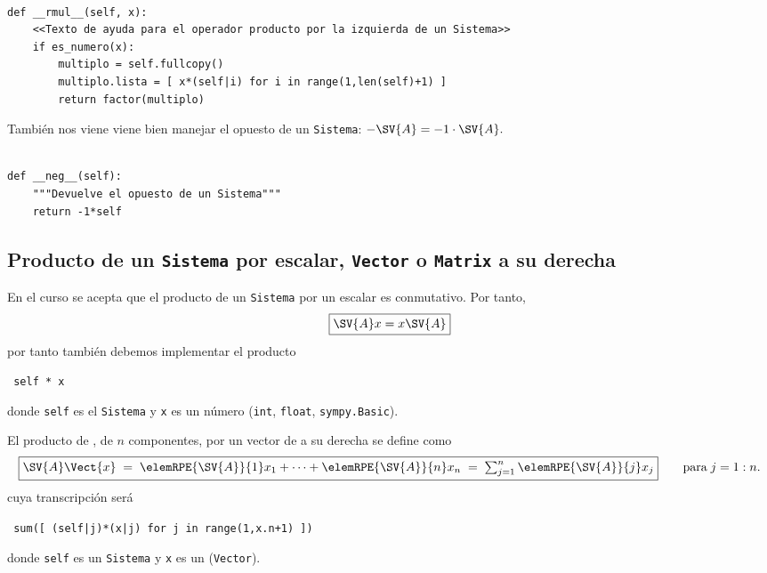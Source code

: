 \documentclass[11pt]{report}
\begin{document}
\begin{verbatim}

def __rmul__(self, x):
    <<Texto de ayuda para el operador producto por la izquierda de un Sistema>>
    if es_numero(x):
        multiplo = self.fullcopy()
        multiplo.lista = [ x*(self|i) for i in range(1,len(self)+1) ]
        return factor(multiplo)

\end{verbatim}

También nos viene viene bien manejar el opuesto de un \texttt{Sistema}:
\begin{math}
 -\SV{A}=-1\cdot\SV{A}.
\end{math}

\begin{verbatim}

def __neg__(self):
    """Devuelve el opuesto de un Sistema"""
    return -1*self

\end{verbatim}

\subsection{Producto de un \texttt{Sistema} por escalar, \texttt{Vector} o  \texttt{Matrix} a su derecha}
\label{sec:org3636703}

En el curso se acepta que el producto de un \texttt{Sistema} por un escalar
es conmutativo. Por tanto,
\begin{displaymath}
  \fbox{\begin{math} 
           \SV{A}x=x\SV{A}
        \end{math}}
\end{displaymath}
por tanto también debemos implementar el producto
\begin{center}
  \Verb/ self * x /
\end{center}
donde \texttt{self} es el \texttt{Sistema} y \texttt{x} es un número (\texttt{int}, \texttt{float},
\texttt{sympy.Basic}).


El producto de , de \(n\) componentes, por un vector  de
\R[n] a su derecha se define como
\begin{displaymath}  
    \fbox{$\SV{A}\Vect{x}\;=\;\elemRPE{\SV{A}}{1}x_1+\cdots+\elemRPE{\SV{A}}{n}x_n\;=\;\sum_{j=1}^n\elemRPE{\SV{A}}{j}x_j$}
    \qquad\text{para}\; j=1:n.
\end{displaymath}
cuya transcripción será
\begin{center}
  \Verb/ sum([ (self|j)*(x|j) for j in range(1,x.n+1) ]) /
\end{center}
donde \texttt{self} es un \texttt{Sistema} y \texttt{x} es un (\texttt{Vector}).
\end{document}
